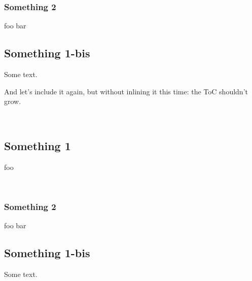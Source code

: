 \subsubsection{Something 2\label{something-2}}%
\label{container-page-test+u+package+++ml-module-Include+u+sections-val-bar}\begin{ocamlindent}\begin{flushleft}\end{flushleft}%
foo bar\end{ocamlindent}%
\medbreak
\subsection{Something 1-bis\label{something-1-bis}}%
\begin{flushleft}\end{flushleft}%
Some text.

\begin{flushleft}\end{flushleft}%
And let's include it again, but without inlining it this time: the ToC shouldn't grow.

 \hyperref[container-page-test+u+package+++ml-module-Include+u+sections-module-type-Something]{}\label{container-page-test+u+package+++ml-module-Include+u+sections-val-something}\\
\subsection{Something 1\label{something-1}}%
\begin{flushleft}\end{flushleft}%
foo

\label{container-page-test+u+package+++ml-module-Include+u+sections-val-foo}\\
\subsubsection{Something 2\label{something-2}}%
\label{container-page-test+u+package+++ml-module-Include+u+sections-val-bar}\begin{ocamlindent}\begin{flushleft}\end{flushleft}%
foo bar\end{ocamlindent}%
\medbreak
\subsection{Something 1-bis\label{something-1-bis}}%
\begin{flushleft}\end{flushleft}%
Some text.



